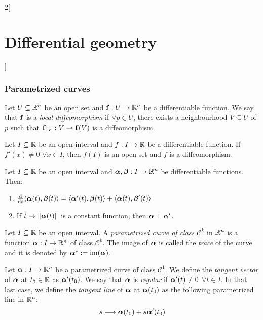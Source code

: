 \documentclass[../../../main.tex]{subfiles}
\begin{document}
\begin{multicols}{2}[\section{Differential geometry}]
  \subsubsection{Parametrized curves}\label{DG_curves}
  \begin{definition}
    Let $U\subseteq\mathbb{R}^n$ be an open set and $\boldsymbol{\mathrm{f}}:U\rightarrow\mathbb{R}^n$ be a differentiable function. We say that $\boldsymbol{\mathrm{f}}$ is a \emph{local diffeomorphism} if $\forall p\in U$, there exists a neighbourhood $V\subseteq U$ of $p$ such that $\boldsymbol{\mathrm{f}}|_V:V\rightarrow \boldsymbol{\mathrm{f}}(V)$ is a diffeomorphism.
  \end{definition}
  \begin{proposition}
    Let $I\subseteq\mathbb{R}$ be an open interval and $f:I\rightarrow\mathbb{R}$ be a differentiable function. If $f'(x)\ne 0$ $\forall x\in I$, then $f(I)$ is an open set and $f$ is a diffeomorphism.
  \end{proposition}
  \begin{proposition}
    Let $I\subseteq\mathbb{R}$ be an open interval and $\boldsymbol{\mathrm{\alpha}},\boldsymbol{\mathrm{\beta}}:I\rightarrow\mathbb{R}^n$ be differentiable functions. Then:
    \begin{enumerate}
      \item $\dv{}{t}\langle\boldsymbol{\mathrm{\alpha}}(t),\boldsymbol{\mathrm{\beta}}(t)\rangle=\langle\boldsymbol{\mathrm{\alpha}}'(t),\boldsymbol{\mathrm{\beta}}(t)\rangle+\langle\boldsymbol{\mathrm{\alpha}}(t),\boldsymbol{\mathrm{\beta}}'(t)\rangle$
      \item If $t\mapsto\|\boldsymbol{\mathrm{\alpha}}(t)\|$ is a constant function, then $\boldsymbol{\mathrm{\alpha}}\perp\boldsymbol{\mathrm{\alpha}}'$.
    \end{enumerate}
  \end{proposition}
  \begin{definition}
    Let $I\subseteq\mathbb{R}$ be an open interval. A \emph{parametrized curve of class $\mathcal{C}^k$} in $\mathbb{R}^n$ is a function $\boldsymbol{\mathrm{\alpha}}:I\rightarrow\mathbb{R}^n$ of class $\mathcal{C}^k$. The image of $\boldsymbol{\mathrm{\alpha}}$ is called the \emph{trace} of the curve and it is denoted by $\boldsymbol{\mathrm{\alpha}}^*:=\operatorname{im}(\boldsymbol{\mathrm{\alpha}})$.
  \end{definition}
  \begin{definition}
    Let $\boldsymbol{\mathrm{\alpha}}:I\rightarrow\mathbb{R}^n$ be a parametrized curve of class $\mathcal{C}^1$. We define the \emph{tangent vector} of $\boldsymbol{\mathrm{\alpha}}$ at $t_0\in\mathbb{R}$ as $\boldsymbol{\mathrm{\alpha}}'(t_0)$. We say that $\boldsymbol{\mathrm{\alpha}}$ is \emph{regular} if $\boldsymbol{\mathrm{\alpha}}'(t)\ne 0$ $\forall t\in I$. In that last case, we define the \emph{tangent line} of $\boldsymbol{\mathrm{\alpha}}$ at $\boldsymbol{\mathrm{\alpha}}(t_0)$ as the following parametrized line in $\mathbb{R}^n$: $$s\longmapsto \boldsymbol{\mathrm{\alpha}}(t_0)+s\boldsymbol{\mathrm{\alpha}}'(t_0)$$
  \end{definition}

\end{multicols}
\end{document}
